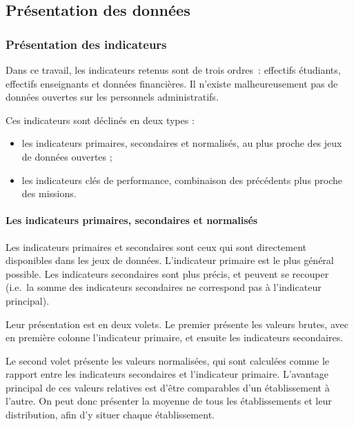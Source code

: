 \documentclass[12pt,french,landscape]{article}
\providecommand{\tightlist}{%
  \setlength{\itemsep}{0pt}\setlength{\parskip}{0pt}}
\begin{document}
\begin{multicols}{2}

\newpage
\tableofcontents
\newpage
\part{Présentation des données}

\hypertarget{pruxe9sentation-des-indicateurs}{%
\section{Présentation des
indicateurs}\label{pruxe9sentation-des-indicateurs}}

Dans ce travail, les indicateurs retenus sont de trois ordres~:
effectifs étudiants, effectifs enseignants et données financières. Il
n'existe malheureusement pas de données ouvertes sur les personnels
administratifs.

Ces indicateurs sont déclinés en deux types :

\begin{itemize}
\tightlist
\item
  les indicateurs primaires, secondaires et normalisés, au plus proche
  des jeux de données ouvertes ;
\item
  les indicateurs clés de performance, combinaison des précédents plus
  proche des missions.
\end{itemize}

\hypertarget{les-indicateurs-primaires-secondaires-et-normalisuxe9s}{%
\subsection{Les indicateurs primaires, secondaires et
normalisés}\label{les-indicateurs-primaires-secondaires-et-normalisuxe9s}}

Les indicateurs primaires et secondaires sont ceux qui sont directement
disponibles dans les jeux de données. L'indicateur primaire est le plus
général possible. Les indicateurs secondaires sont plus précis, et
peuvent se recouper (i.e.~la somme des indicateurs secondaires ne
correspond pas à l'indicateur principal).

Leur présentation est en deux volets. Le premier présente les valeurs
brutes, avec en première colonne l'indicateur primaire, et ensuite les
indicateurs secondaires.

Le second volet présente les valeurs normalisées, qui sont calculées
comme le rapport entre les indicateurs secondaires et l'indicateur
primaire. L'avantage principal de ces valeurs relatives est d'être
comparables d'un établissement à l'autre. On peut donc présenter la
moyenne de tous les établissements et leur distribution, afin d'y situer
chaque établissement.


\end{multicols}
\end{document}
